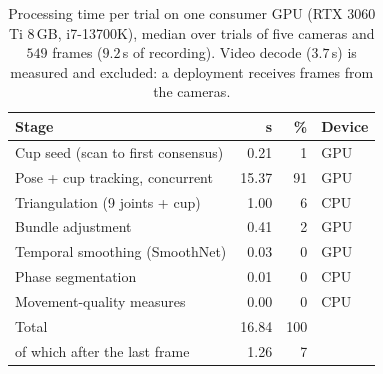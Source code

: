\begin{table}[t]
\caption{Processing time per trial on one consumer GPU (RTX 3060 Ti 8\,GB, i7-13700K),
median over trials of five cameras and $549$ frames ($9.2$\,s of recording). Video decode
($3.7$\,s) is measured and excluded: a deployment receives frames from the cameras.}
\label{tab:latency}
\centering
\footnotesize
\setlength{\tabcolsep}{4pt}
\begin{tabular}{lrrl}
\toprule
Stage & s & \% & Device \\
\midrule
Cup seed (scan to first consensus) & 0.21 & 1 & GPU \\
Pose + cup tracking, concurrent & 15.37 & 91 & GPU \\
Triangulation (9 joints + cup) & 1.00 & 6 & CPU \\
Bundle adjustment & 0.41 & 2 & GPU \\
Temporal smoothing (SmoothNet) & 0.03 & 0 & GPU \\
Phase segmentation & 0.01 & 0 & CPU \\
Movement-quality measures & 0.00 & 0 & CPU \\
\midrule
Total & 16.84 & 100 & \\
\;\;of which after the last frame & 1.26 & 7 & \\
\bottomrule
\end{tabular}
\end{table}

